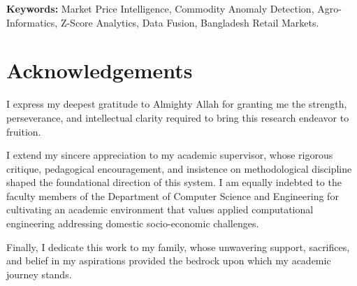 \documentclass[12pt,a4paper,oneside]{report}
\begin{document}
\vspace{0.5cm}
\noindent \textbf{Keywords:} Market Price Intelligence, Commodity Anomaly Detection, Agro-Informatics, Z-Score Analytics, Data Fusion, Bangladesh Retail Markets.

\newpage

\chapter*{Acknowledgements}
I express my deepest gratitude to Almighty Allah for granting me the strength, perseverance, and intellectual clarity required to bring this research endeavor to fruition.

I extend my sincere appreciation to my academic supervisor, whose rigorous critique, pedagogical encouragement, and insistence on methodological discipline shaped the foundational direction of this system. I am equally indebted to the faculty members of the Department of Computer Science and Engineering for cultivating an academic environment that values applied computational engineering addressing domestic socio-economic challenges.

Finally, I dedicate this work to my family, whose unwavering support, sacrifices, and belief in my aspirations provided the bedrock upon which my academic journey stands.

\newpage

\tableofcontents
\listoffigures
\listoftables

\newpage
{}
\setcounter{page}{1}











\end{document}
